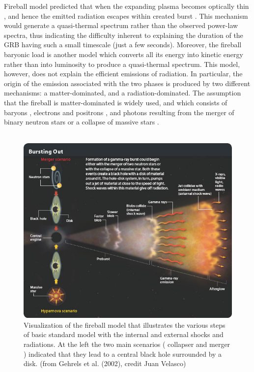 Fireball  model  predicted that  when the expanding plasma becomes optically thin ,  and hence the  emitted  radiation  escapes   within  created  burst . This  mechanism would  generate  a quasi-thermal  spectrum  rather  than  the observed power-law spectra, thus  indicating  the  difficulty inherent to explaining the duration of the GRB  having  such  a small  timescale  (just a few seconds). Moreover, the fireball baryonic  load  is  another  model  which  converts  all its energy into kinetic energy  rather  than  into  luminosity to  produce  a quasi-thermal  spectrum. This model,  however,  does not explain the efficient emissions  of radiation. In particular,  the  origin  of  the  emission  associated  with  the  two  phases is produced  by  two different  mechanisms:  a matter-dominated, and  a radiation-dominated. The  assumption  that  the  fireball is  matter-dominated  is  widely  used, and  which  consists  of  baryons ,  electrons  and  positrons , and  photons  resulting  from  the merger  of  binary  neutron  stars  or  a collapse  of  massive stars .\citep{10} \citep{15}\citep{16}\\\\ 
\begin{figure}[h]
\begin{center}
\includegraphics[scale=0.5]{Figures/fig5.png}
\caption{Visualization  of  the  fireball  model that illustrates  the various steps of  basic  standard  model  with  the internal  and  external  shocks and  radiations. At  the left  the  two main  scenarios ( collapser and  merger ) indicated  that they  lead  to  a central  black  hole  surrounded by a disk. (from Gehrels et al. (2002), credit Juan Velasco)\citep{13}}
\end{center}
\end{figure} 
